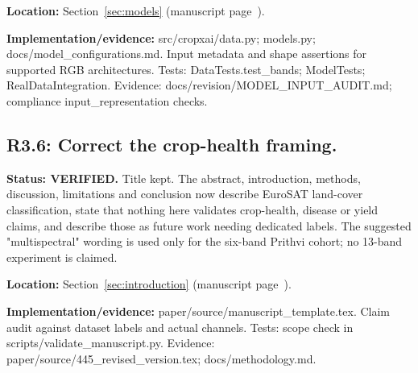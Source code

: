\documentclass[3p,times,procedia]{elsarticle}
\begin{document}
\par\textbf{Location:} Section~\ref{sec:models} (manuscript page~\pageref{sec:models}).

\par\textbf{Implementation/evidence:} src/cropxai/data.py; models.py; docs/model\_configurations.md. Input metadata and shape assertions for supported RGB architectures. Tests: DataTests.test\_bands; ModelTests; RealDataIntegration. Evidence: docs/revision/MODEL\_INPUT\_AUDIT.md; compliance input\_representation checks.

\subsection*{R3.6: Correct the crop-health framing.}

\textbf{Status: VERIFIED.} Title kept. The abstract, introduction, methods, discussion, limitations and conclusion now describe EuroSAT land-cover classification, state that nothing here validates crop-health, disease or yield claims, and describe those as future work needing dedicated labels. The suggested "multispectral" wording is used only for the six-band Prithvi cohort; no 13-band experiment is claimed.

\par\textbf{Location:} Section~\ref{sec:introduction} (manuscript page~\pageref{sec:introduction}).

\par\textbf{Implementation/evidence:} paper/source/manuscript\_template.tex. Claim audit against dataset labels and actual channels. Tests: scope check in scripts/validate\_manuscript.py. Evidence: paper/source/445\_revised\_version.tex; docs/methodology.md.
\end{document}
